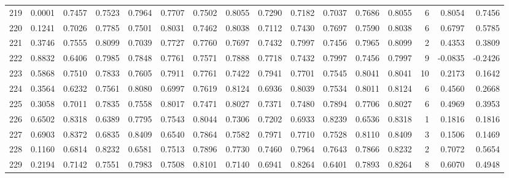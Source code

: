 \begin{tabular}{lrrrrrrrrrrrrrrr}
219 &      0.0001 &  0.7457 &  0.7523 &  0.7964 &  0.7707 &  0.7502 &  0.8055 &  0.7290 &  0.7182 &  0.7037 &   0.7686 &     0.8055 &      6 &                    0.8054 &                     0.7456 \\
220 &      0.1241 &  0.7026 &  0.7785 &  0.7501 &  0.8031 &  0.7462 &  0.8038 &  0.7112 &  0.7430 &  0.7697 &   0.7590 &     0.8038 &      6 &                    0.6797 &                     0.5785 \\
221 &      0.3746 &  0.7555 &  0.8099 &  0.7039 &  0.7727 &  0.7760 &  0.7697 &  0.7432 &  0.7997 &  0.7456 &   0.7965 &     0.8099 &      2 &                    0.4353 &                     0.3809 \\
222 &      0.8832 &  0.6406 &  0.7985 &  0.7848 &  0.7761 &  0.7571 &  0.7888 &  0.7718 &  0.7432 &  0.7997 &   0.7456 &     0.7997 &      9 &                   -0.0835 &                    -0.2426 \\
223 &      0.5868 &  0.7510 &  0.7833 &  0.7605 &  0.7911 &  0.7761 &  0.7422 &  0.7941 &  0.7701 &  0.7545 &   0.8041 &     0.8041 &     10 &                    0.2173 &                     0.1642 \\
224 &      0.3564 &  0.6232 &  0.7561 &  0.8080 &  0.6997 &  0.7619 &  0.8124 &  0.6936 &  0.8039 &  0.7534 &   0.8011 &     0.8124 &      6 &                    0.4560 &                     0.2668 \\
225 &      0.3058 &  0.7011 &  0.7835 &  0.7558 &  0.8017 &  0.7471 &  0.8027 &  0.7371 &  0.7480 &  0.7894 &   0.7706 &     0.8027 &      6 &                    0.4969 &                     0.3953 \\
226 &      0.6502 &  0.8318 &  0.6389 &  0.7795 &  0.7543 &  0.8044 &  0.7306 &  0.7202 &  0.6933 &  0.8239 &   0.6536 &     0.8318 &      1 &                    0.1816 &                     0.1816 \\
227 &      0.6903 &  0.8372 &  0.6835 &  0.8409 &  0.6540 &  0.7864 &  0.7582 &  0.7971 &  0.7710 &  0.7528 &   0.8110 &     0.8409 &      3 &                    0.1506 &                     0.1469 \\
228 &      0.1160 &  0.6814 &  0.8232 &  0.6581 &  0.7513 &  0.7896 &  0.7730 &  0.7460 &  0.7964 &  0.7643 &   0.7866 &     0.8232 &      2 &                    0.7072 &                     0.5654 \\
229 &      0.2194 &  0.7142 &  0.7551 &  0.7983 &  0.7508 &  0.8101 &  0.7140 &  0.6941 &  0.8264 &  0.6401 &   0.7893 &     0.8264 &      8 &                    0.6070 &                     0.4948 \\

\end{tabular}
